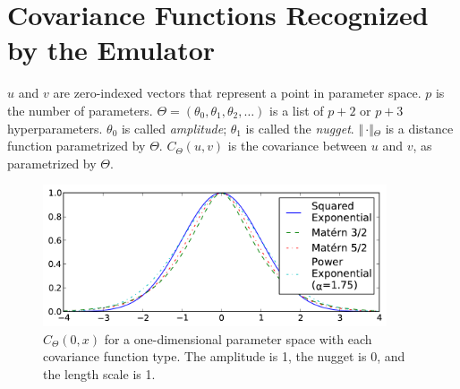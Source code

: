 
\section{Covariance Functions Recognized by the Emulator}
\label{sec:CovarianceFunctions}

$u$ and $v$ are zero-indexed vectors that represent a point in parameter space.  $p$ is the number of parameters. $\Theta=(\theta_0, \theta_1,\theta_2,\ldots)$ is a list of $p+2$ or $p+3$ hyperparameters. $\theta_0$ is called \emph{amplitude}; $\theta_1$ is called the \emph{nugget}.  $\Vert\,\cdotp\Vert{}_\Theta$ is a distance function parametrized by $\Theta$.  $C_\Theta{}(u, v)$ is the covariance between $u$ and $v$, as parametrized by $\Theta$.  


\begin{figure}[b]
\includegraphics[width=4in]{figs/kernel_functions.pdf}
\parbox[b]{2.5in}
{\caption{\label{fig:kernelfunctions}
$C_\Theta{}(0, x)$ for a one-dimensional parameter space with each covariance function type. The amplitude is 1, the nugget is 0, and the length scale is 1.
\vspace*{30pt}
}}
\end{figure}

